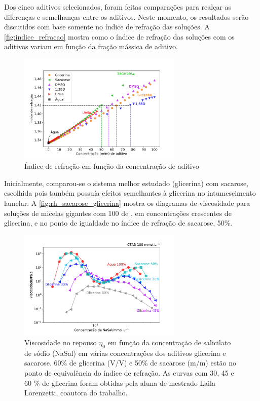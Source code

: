 			Dos cinco aditivos selecionados, foram feitas comparações para realçar as diferenças e semelhanças entre os aditivos. Neste momento, os resultados serão discutidos com base somente no índice de refração das soluções. A \autoref{fig:indice_refracao} mostra como o índice de refração das soluções com os aditivos variam em função da fração mássica de aditivo.
					
			\begin{figure}[h]
				\centering
				\includegraphics[width=0.7\textwidth]{imagens/propriedades/indice_refracao}
				\caption{Índice de refração em função da concentração de aditivo}
				\label{fig:indice_refracao}
			\end{figure}
	
			Inicialmente, comparou-se o sistema melhor estudado (glicerina) com sacarose, escolhida pois também possuía efeitos semelhantes à glicerina no intumescimento lamelar. A \autoref{fig:rh_sacarose_glicerina} mostra os diagramas de viscosidade para soluções de micelas gigantes com 100 \mM{} de \CTAB, em concentrações crescentes de glicerina, e no ponto de igualdade no índice de refração de sacarose, 50\%.
			
			\begin{figure}[h]
				\centering
				\includegraphics[width=0.7\textwidth]{imagens/reologia/RH_sacarose_glicerina}
				\caption{Viscosidade no repouso \(\eta_0\) em função da concentração de salicilato de sódio (NaSal) em várias concentrações dos aditivos glicerina e sacarose. 60\% de glicerina (V/V) e 50\% de sacarose (m/m) estão no ponto de equivalência do índice de refração. As curvas com 30, 45 e 60 \% de glicerina foram obtidas pela aluna de mestrado Laila Lorenzetti, coautora do trabalho.}
				\label{fig:rh_sacarose_glicerina}
			\end{figure}
			
